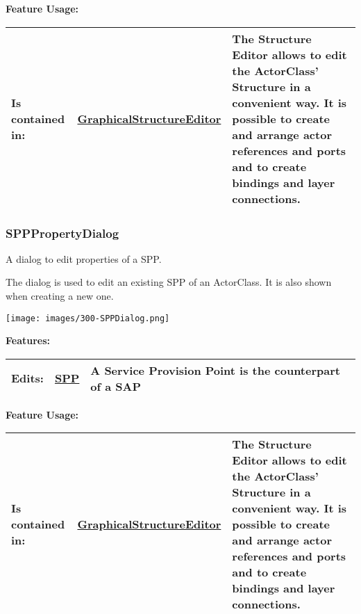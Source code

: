 	\begingroup
	\textbf{Feature Usage:}
	\renewcommand{\arraystretch}{1.8} %
	\begin{longtable}{l|l p{}}
		\hline
	Is contained in: & \tabitem \hyperlink{ref:GraphicalStructureEditor}{GraphicalStructureEditor}  & The Structure Editor allows to edit the ActorClass' Structure in a convenient way. It is possible to create and arrange actor references and ports and to create bindings and layer connections.\\
	\hline
	\end{longtable}
	\endgroup
		
	
	\vspace{\baselineskip}
	\vspace{\baselineskip}
	\vspace{\baselineskip}
	
\subsubsection{SPPPropertyDialog}
	\hypertarget{ref:SPPPropertyDialog}{}
	A dialog to edit properties of a SPP.
		
	The dialog is used to edit an existing SPP of an ActorClass. It is also shown when creating a new one.
	\begin{center}
	\texttt{[image: images/300-SPPDialog.png]}
	\end{center}
		
		
	\begingroup
	\textbf{Features:}
	\renewcommand{\arraystretch}{1.8} %
	\begin{longtable}{l|l p{}}
		\hline
	Edits: & \tabitem \hyperlink{ref:SPP}{SPP}  & A Service Provision Point is the counterpart of a SAP\\
	\hline
	\end{longtable}
	\endgroup
		
	\begingroup
	\textbf{Feature Usage:}
	\renewcommand{\arraystretch}{1.8} %
	\begin{longtable}{l|l p{}}
		\hline
	Is contained in: & \tabitem \hyperlink{ref:GraphicalStructureEditor}{GraphicalStructureEditor}  & The Structure Editor allows to edit the ActorClass' Structure in a convenient way. It is possible to create and arrange actor references and ports and to create bindings and layer connections.\\
	\hline
	\end{longtable}
	\endgroup
		
